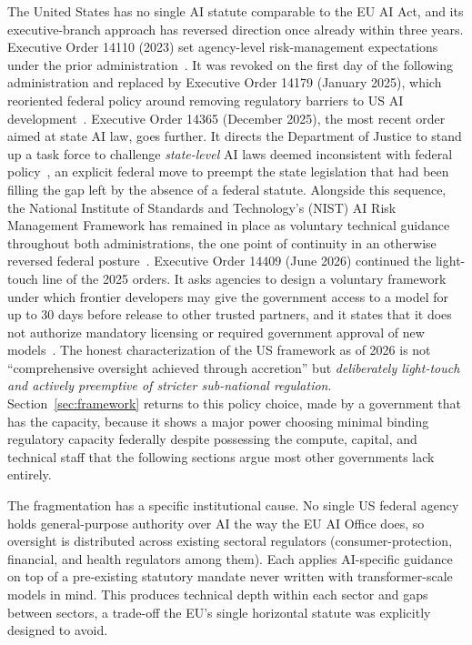 \documentclass[journal]{IEEEtran}
\begin{document}
The United States has no single AI statute comparable to the EU AI Act, and its executive-branch approach has reversed direction once already within three years. Executive Order 14110 (2023) set agency-level risk-management expectations under the prior administration~\cite{biden2023eo14110}. It was revoked on the first day of the following administration and replaced by Executive Order 14179 (January 2025), which reoriented federal policy around removing regulatory barriers to US AI development~\cite{trump2025eo14179}. Executive Order 14365 (December 2025), the most recent order aimed at state AI law, goes further. It directs the Department of Justice to stand up a task force to challenge \emph{state-level} AI laws deemed inconsistent with federal policy~\cite{trump2025eo14365},
an explicit federal move to preempt the state legislation that had been filling the gap left by the absence of a federal statute. Alongside this sequence, the National Institute of Standards and Technology's (NIST) AI Risk Management Framework has remained in place as voluntary technical guidance throughout both administrations, the one point of continuity in an otherwise reversed federal posture~\cite{nist2023airmf}.
Executive Order 14409 (June 2026) continued the light-touch line of the 2025 orders. It asks agencies to design a voluntary framework under which frontier developers may give the government access to a model for up to 30 days before release to other trusted partners, and it states that it does not authorize mandatory licensing or required government approval of new models~\cite{trump2026eo14409}.
The honest characterization of the US framework as of 2026 is not ``comprehensive oversight achieved through accretion'' but \emph{deliberately light-touch and actively preemptive of stricter sub-national regulation}. Section~\ref{sec:framework} returns to this policy choice, made by a government that has the capacity, because it shows a major power choosing minimal binding regulatory capacity federally despite possessing the compute, capital, and technical staff that the following sections argue most other governments lack entirely.

The fragmentation has a specific institutional cause. No single US federal agency holds general-purpose authority over AI the way the EU AI Office does, so oversight is distributed across existing sectoral regulators (consumer-protection, financial, and health regulators among them). Each applies AI-specific guidance on top of a pre-existing statutory mandate never written with transformer-scale models in mind.
This produces technical depth within each sector and gaps between sectors, a trade-off the EU's single horizontal statute was explicitly designed to avoid.
\end{document}
